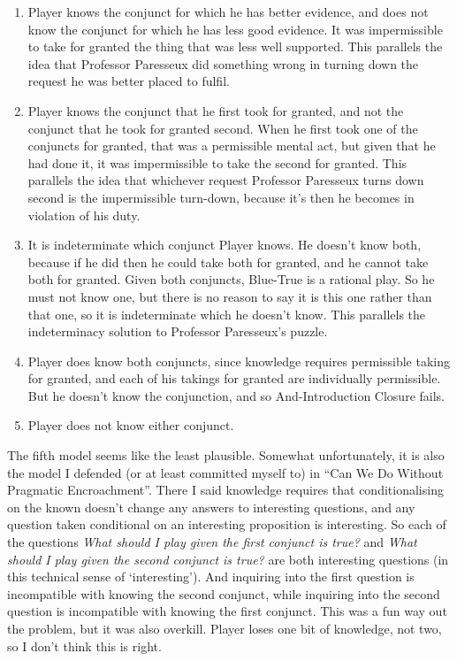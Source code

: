 \documentclass[
  12pt,
  letterpaper,
]{scrbook}
\providecommand{\tightlist}{%
  \setlength{\itemsep}{0pt}\setlength{\parskip}{0pt}}\usepackage{longtable,booktabs,array}
\begin{document}
\begin{enumerate}
\def\labelenumi{\arabic{enumi}.}
\tightlist
\item
  Player knows the conjunct for which he has better evidence, and does
  not know the conjunct for which he has less good evidence. It was
  impermissible to take for granted the thing that was less well
  supported. This parallels the idea that Professor Paresseux did
  something wrong in turning down the request he was better placed to
  fulfil.
\item
  Player knows the conjunct that he first took for granted, and not the
  conjunct that he took for granted second. When he first took one of
  the conjuncts for granted, that was a permissible mental act, but
  given that he had done it, it was impermissible to take the second for
  granted. This parallels the idea that whichever request Professor
  Paresseux turns down second is the impermissible turn-down, because
  it's then he becomes in violation of his duty.
\item
  It is indeterminate which conjunct Player knows. He doesn't know both,
  because if he did then he could take both for granted, and he cannot
  take both for granted. Given both conjuncts, Blue-True is a rational
  play. So he must not know one, but there is no reason to say it is
  this one rather than that one, so it is indeterminate which he doesn't
  know. This parallels the indeterminacy solution to Professor
  Paresseux's puzzle.
\item
  Player does know both conjuncts, since knowledge requires permissible
  taking for granted, and each of his takings for granted are
  individually permissible. But he doesn't know the conjunction, and so
  And-Introduction Closure fails.
\item
  Player does not know either conjunct.
\end{enumerate}

The fifth model seems like the least plausible. Somewhat unfortunately,
it is also the model I defended (or at least committed myself to) in
``Can We Do Without Pragmatic Encroachment''. There I said knowledge
requires that conditionalising on the known doesn't change any answers
to interesting questions, and any question taken conditional on an
interesting proposition is interesting. So each of the questions
\emph{What should I play given the first conjunct is true?} and
\emph{What should I play given the second conjunct is true?} are both
interesting questions (in this technical sense of `interesting'). And
inquiring into the first question is incompatible with knowing the
second conjunct, while inquiring into the second question is
incompatible with knowing the first conjunct. This was a fun way out the
problem, but it was also overkill. Player loses one bit of knowledge,
not two, so I don't think this is right.
\end{document}
